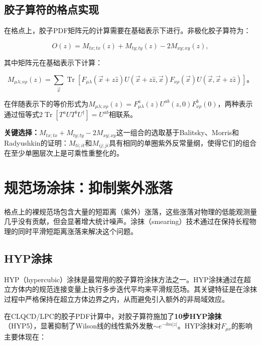\documentclass[12pt,a4paper]{ctexart}
\theoremstyle{definition}
\begin{document}
\subsection{胶子算符的格点实现}

在格点上，胶子PDF矩阵元的计算需要在基础表示下进行。非极化胶子算符为\cite{Chen2025gluon,Zhang2019}：

\begin{equation}
O(z) = M_{tx;tx}(z) + M_{ty;ty}(z) - 2M_{xy;xy}(z),
\label{eq:gluon_operator}
\end{equation}

其中矩阵元在基础表示下计算：

\begin{equation}
M_{\mu\lambda;\nu\rho}(z) = \sum_{\vec{x}} \operatorname{Tr}[F_{\mu\lambda}(\vec{x} + z\hat{z}) U(\vec{x} + z\hat{z}, \vec{x}) F_{\nu\rho}(\vec{x}) U(\vec{x}, \vec{x} + z\hat{z})]。
\label{eq:gluon_ME_lattice}
\end{equation}

在伴随表示下的等价形式为$M_{\mu\lambda;\nu\rho}(z) = F^a_{\mu\lambda}(z)U^{ab}(z,0)F^b_{\nu\rho}(0)$，两种表示通过恒等式$2\operatorname{Tr}[T^a U T^b U^\dagger] = U^{ab}$相联系。

\textbf{关键选择：}$M_{tx;tx} + M_{ty;ty} - 2M_{xy;xy}$这一组合的选取基于Balitsky、Morris和Radyushkin\cite{Balitsky2020}的证明：$M_{ti;it}$和$M_{ij;ji}$具有相同的单圈紫外反常量纲，使得它们的组合在至少单圈层次上是可乘性重整化的。

\section{规范场涂抹：抑制紫外涨落}

格点上的裸规范场包含大量的短距离（紫外）涨落，这些涨落对物理的低能观测量几乎没有贡献，但会显著增大统计噪声。涂抹（smearing）技术通过在保持长程物理的同时平滑短距离涨落来解决这个问题。

\subsection{HYP涂抹}

HYP（hypercubic）涂抹是最常用的胶子算符涂抹方法之一\cite{NoteGluonPDFs,Chen2025gluon}。HYP涂抹通过在超立方体内的规范连接变量上执行多步迭代平均来平滑规范场。其关键特征是在涂抹过程中$\textbf{严格保持在超立方体边界之内}$，从而避免引入额外的非局域效应。

在CLQCD/LPC的胶子PDF计算中，对胶子算符施加了\textbf{10步HYP涂抹}（HYP5）\cite{Chen2025gluon}，显著抑制了Wilson线的线性紫外发散$\sim e^{-\delta m|z|}$。HYP涂抹对$F_{\mu\nu}$的影响主要体现在：
\end{document}
